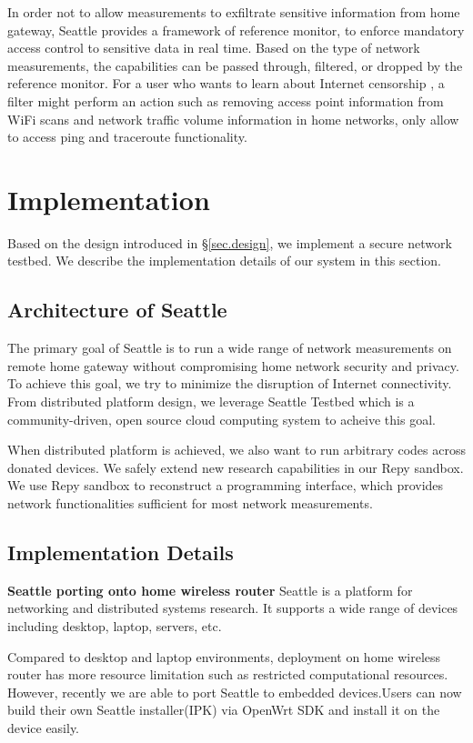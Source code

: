 \documentclass[11pt, oneside]{article}   	%
\begin{document}
In order not to allow measurements to exfiltrate sensitive information from home gateway, Seattle provides a framework of reference monitor, to enforce mandatory access control to sensitive data in real time. Based on the type of network measurements, the capabilities can be passed through, filtered, or dropped by the reference monitor. For a user who wants to learn about Internet censorship , a filter might perform an action such as removing access point information from WiFi scans and network traffic volume information in home networks, only allow to access ping and traceroute functionality.

\section{Implementation}
\label{sec.implementation}

Based on the design introduced in \S{\ref{sec.design}}, we implement a secure network testbed. We describe the implementation details of our system in this section.

\subsection{Architecture of Seattle}
The primary goal of Seattle is to run a wide range of network measurements on remote home gateway without compromising home network security and privacy. To achieve this goal, we try to minimize the disruption of Internet connectivity. From distributed platform design, we leverage Seattle Testbed which is a community-driven, open source cloud computing system to acheive this goal. 

When distributed platform is achieved, we also want to run arbitrary codes across donated devices. We safely extend new research capabilities in our Repy sandbox. We use Repy sandbox to reconstruct a programming interface, which provides network functionalities sufficient for most network measurements.

\subsection{Implementation Details}
\textbf{Seattle porting onto home wireless router} 
Seattle is a platform for networking and distributed systems research. It supports a wide range of devices including desktop, laptop, servers, etc.

Compared to desktop and laptop environments, deployment on home wireless router has more resource limitation such as restricted computational resources. However, recently we are able to port Seattle to embedded devices.Users can now build their own Seattle installer(IPK) via OpenWrt SDK and install it on the device easily. 
\end{document}
